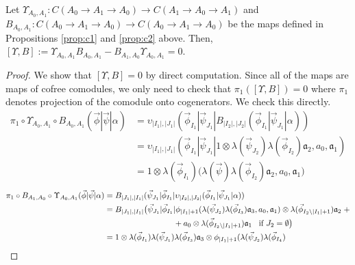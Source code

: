 \begin{prop}
\label{prop:c3}
Let $\Upsilon_{A_0,A_1}: 
C(A_0 \to A_1 \to A_0) \longrightarrow
C(A_1 \to A_0 \to A_1)$ and 
$B_{A_0,A_1}:C(A_0 \to A_1 \to A_0) 
\longrightarrow C(A_0 \to A_1 \to A_0)$ 
be the maps defined in Propositions 
\ref{prop:c1} and \ref{prop:c2} above. 
Then, $[\Upsilon, B] := 
\Upsilon_{A_0,A_1} B_{A_0,A_1} - 
B_{A_1,A_0}\Upsilon_{A_0,A_1} = 0$.
\end{prop}
%
\begin{proof}
We show that $[\Upsilon, B] = 0$ by direct 
computation. Since all of the maps are maps 
of cofree comodules, we only need to check 
that $\pi_1([\Upsilon, B]) = 0$ where 
$\pi_1$ denotes projection of the comodule 
onto cogenerators. We check this directly.
%
\begin{equation*}
\begin{aligned}
\pi_1 \circ \Upsilon_{A_0,A_1} \circ B_{A_0,A_1} 
  (\vec{\phi} | \vec{\psi} | \alpha ) 
&= \upsilon_{|I_1|, |J_1|} (\vec{\phi}_{I_1} | \vec{\psi}_{J_1} | 
  B_{|I_2|, |J_2|} (\vec{\phi}_{I_1} | \vec{\psi}_{J_1} | \alpha)) \\
&= \upsilon_{|I_1|, |J_1|} (\vec{\phi}_{I_1} | \vec{\psi}_{J_1} | 
  1 \otimes \lambda(\vec{\psi}_{J_2}) \lambda(\vec{\phi}_{I_2}) 
  \mathfrak{a}_2, a_0, \mathfrak{a}_1) \\
&= 1 \otimes \lambda(\vec{\phi}_{I_1}) \big( 
  \lambda(\vec{\psi}) \lambda(\vec{\phi}_{I_2}) 
  \mathfrak{a}_2, a_0, \mathfrak{a}_1 \big)
\end{aligned}
\end{equation*}
%
\begin{align*}
\pi_1 \circ B_{A_1,A_0} \circ \Upsilon_{A_0,A_1} 
  (\vec{\phi} | \vec{\psi} | \alpha ) 
&= B_{|J_1|, |I_1|} (\vec{\psi}_{J_1} | \vec{\phi}_{I_1} | 
  \upsilon_{|I_2|, |J_2|} (\vec{\phi}_{I_1} | \vec{\psi}_{J_1} | \alpha)) \\
&= B_{|J_1|, |I_1|} \big(\vec{\psi}_{J_1} | \vec{\phi}_{I_1} | \phi_{|I_1|+1} (
  \lambda(\vec{\psi}_{J_2}) \lambda(\vec{\phi}_{I_3}) 
  \mathfrak{a}_3, a_0, \mathfrak{a}_1) \otimes 
  \lambda(\vec{\phi}_{I_2 \backslash |I_1| + 1}) 
  \mathfrak{a}_2 \; + \\
&\hphantom{{}moveovermoveover{}} 
  + a_0 \otimes \lambda(\vec{\phi}_{I_2 \backslash |I_1| + 1}) 
  \mathfrak{a}_1 \; \; \; 
  \text{if }J_2 = \emptyset \big) \\
&= 1 \otimes \lambda(\vec{\phi}_{I_1}) \lambda(\vec{\psi}_{J_1}) 
  \lambda(\vec{\phi}_{I_3}) \mathfrak{a}_3 \otimes 
  \phi_{|I_1|+1} (\lambda(\vec{\psi}_{J_2}) \lambda(\vec{\phi}_{I_4}) 

\end{align*}
\end{proof}
